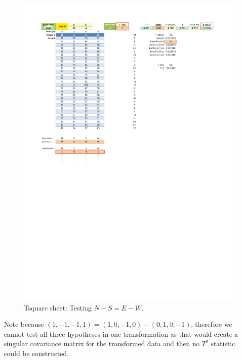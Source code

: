 \documentclass[article]{jss}
\begin{document}
        \begin{figure}[!tbh]
                \includegraphics[width=\linewidth,keepaspectratio=true]{img/TsquareSheetOutput4_markup}
                \centering\protect\caption{Tsquare sheet: Testing $N-S=E-W$.}\label{fig:TsquareSheetOutput4}
        \end{figure}
        
        
        Note because $(1,-1,-1,1) = (1,0,-1,0) - (0,1,0,-1)$, therefore we cannot test all three hypotheses in one transformation as that would create a singular covariance matrix for the transformed data and then no $T^2$ statistic could be constructed.
        
        
        
        
\end{document}
